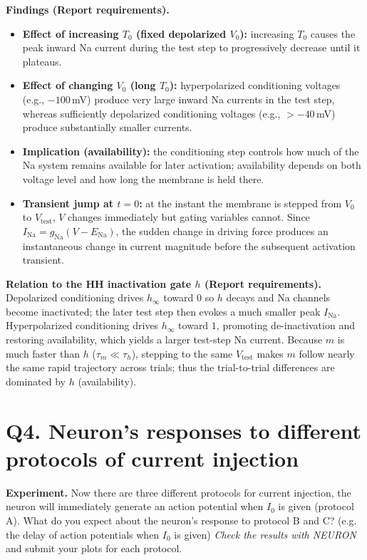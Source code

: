 \documentclass{article}
\begin{document}
\begin{answerbox}
\textbf{Findings (Report requirements).}
\begin{itemize}
    \item \textbf{Effect of increasing $T_0$ (fixed depolarized $V_0$):} increasing $T_0$ causes the peak inward Na current during the test step to progressively decrease until it plateaus.
    \item \textbf{Effect of changing $V_0$ (long $T_0$):} hyperpolarized conditioning voltages (e.g., $-100$\,mV) produce very large inward Na currents in the test step, whereas sufficiently depolarized conditioning voltages (e.g., $>-40$\,mV) produce substantially smaller currents.
    \item \textbf{Implication (availability):} the conditioning step controls how much of the Na system remains available for later activation; availability depends on both voltage level and how long the membrane is held there.
    \item \textbf{Transient jump at $t=0$:} at the instant the membrane is stepped from $V_0$ to $V_{\mathrm{test}}$, $V$ changes immediately but gating variables cannot. Since $I_{\mathrm{Na}}=g_{\mathrm{Na}}(V-E_{\mathrm{Na}})$, the sudden change in driving force produces an instantaneous change in current magnitude before the subsequent activation transient.
\end{itemize}

\textbf{Relation to the HH inactivation gate $h$ (Report requirements).} Depolarized conditioning drives $h_\infty$ toward $0$ so $h$ decays and Na channels become inactivated; the later test step then evokes a much smaller peak $I_{\mathrm{Na}}$. Hyperpolarized conditioning drives $h_\infty$ toward $1$, promoting de-inactivation and restoring availability, which yields a larger test-step Na current. Because $m$ is much faster than $h$ ($\tau_m\ll\tau_h$), stepping to the same $V_{\mathrm{test}}$ makes $m$ follow nearly the same rapid trajectory across trials; thus the trial-to-trial differences are dominated by $h$ (availability).
\end{answerbox}

\clearpage

\section*{\textbf{Q4.} Neuron's responses to different protocols of current injection}

\textbf{Experiment.}
Now there are three different protocols for current injection, the neuron will immediately generate an action potential when $I_0$ is given (protocol A). 
What do you expect about the neuron’s response to protocol B and C?
(e.g. the delay of action potentials when $I_0$ is given)
\textit{Check the results with \textsc{NEURON}} and submit your plots for each protocol.
\end{document}
